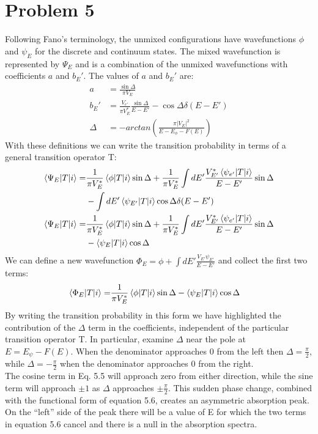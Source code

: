 \documentclass[a4paper,11pt]{article}
\numberwithin{equation}{section}
\newcommand{\pp}[1]{#1'}
\begin{document}
\section{Problem 5}
Following Fano's terminology, the unmixed configurations have wavefunctions $\phi$ and $\psi_E$ for the discrete and continuum states.
The mixed wavefunction is represented by $\Psi_E$ and is a combination of the unmixed wavefunctions with coefficients $a$ and $b_\pp{E}$.
The values of $a$ and $b_\pp{E}$ are:
\begin{align}
 a &= \frac{\sin{\Delta}}{\pi V_E}\\
 b_\pp{E} &= \frac{V_{\pp{e}}}{\pi V_E^*}\frac{\sin{\Delta}}{E-\pp{E}}-\cos{\Delta}\delta(E-\pp{E})\\
 \Delta &= -arctan\left(\frac{\pi|V_E|^2}{E-E_\phi-F(E)}\right)
\end{align}
With these definitions we can write the transition probability in terms of a general transition operator T:
\begin{align}
 \begin{split}
 \braket{\Psi_E|T|i} = &\frac{1}{\pi V_E^*}\braket{\phi|T|i}\sin{\Delta}+\frac{1}{\pi V_E^*}\int d\pp{E} \frac{V_{\pp{E}}^*\braket{\psi_{\pp{e}}|T|i}}{E-\pp{E}}\sin{\Delta} \\
		     &-\int d\pp{E} \braket{\psi_{\pp{E}}|T|i}\cos{\Delta}\delta(E-\pp{E})
 \end{split}\\
 \begin{split}
 \braket{\Psi_E|T|i} = &\frac{1}{\pi V_E^*}\braket{\phi|T|i}\sin{\Delta}+\frac{1}{\pi V_E^*}\int d\pp{E} \frac{V_{\pp{E}}^*\braket{\psi_{\pp{e}}|T|i}}{E-\pp{E}}\sin{\Delta} \\
		     &-\braket{\psi_E|T|i}\cos{\Delta}
 \end{split}
\end{align}
We can define a new wavefunction $\Phi_E=\phi+\int d\pp{E}\frac{V_{\pp{E}}\psi_{\pp{E}}}{E-\pp{E}}$ and collect the first two terms:
\begin{align}
 \braket{\Phi_E|T|i} = &\frac{1}{\pi V_E^*}\braket{\phi|T|i}\sin{\Delta}-\braket{\psi_E|T|i}\cos{\Delta}
\end{align}
By writing the transition probability in this form we have highlighted the contribution of the $\Delta$ term in the coefficients, independent of the particular transition operator T.
In particular, examine $\Delta$ near the pole at $E=E_\psi-F(E)$.
When the denominator approaches 0 from the left then $\Delta=\frac{\pi}{2}$, while $\Delta=-\frac{\pi}{2}$ when the denominator approaches 0 from the right.\\
The cosine term in Eq. 5.5 will approach zero from either direction, while the sine term will approach $\pm 1$ as $\Delta$ approaches $\pm \frac{\pi}{2}$.
This sudden phase change, combined with the functional form of equation 5.6, creates an asymmetric absorption peak. 
On the ``left'' side of the peak there will be a value of E for which the two terms in equation 5.6 cancel and there is a null in the absorption spectra.
\end{document}
